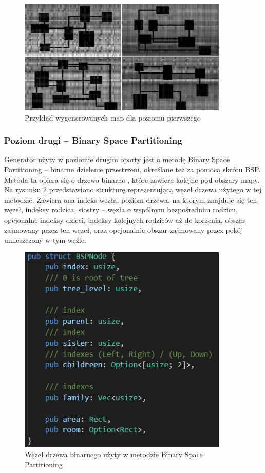 \documentclass[12pt,twoside]{article}
\begin{document}
\FloatBarrier
\begin{figure}[ht]
	\centering
	\includegraphics[width=10cm]{images/generators/level1.png}
	\caption{Przykład wygenerowanych map dla poziomu pierwszego}
	\label{generators:level1}
\end{figure}
\FloatBarrier


\subsubsection{Poziom drugi -- Binary Space Partitioning}
Generator użyty w poziomie drugim oparty jest o metodę Binary Space Partitioning \cite{bsp_source} -- binarne dzielenie przestrzeni, określane też za pomocą skrótu BSP. Metoda ta opiera się o drzewo binarne \cite{book_algo}, które zawiera kolejne pod-obszary mapy. Na rysunku \ref{generators:bsp_node} przedstawiono strukturę reprezentującą węzeł drzewa użytego w tej metodzie. Zawiera ona indeks węzła, poziom drzewa, na którym znajduje się ten węzeł, indeksy rodzica, siostry -- węzła o wspólnym bezpośrednim rodzicu, opcjonalne indeksy dzieci, indeksy kolejnych rodziców aż do korzenia, obszar zajmowany przez ten węzeł, oraz opcjonalnie obszar zajmowany przez pokój umieszczony w tym węźle.

\FloatBarrier
\begin{figure}[ht]
	\centering
	\includegraphics[width=10cm]{images/generators/bsp_node.png}
	\caption{Węzeł drzewa binarnego użyty w metodzie Binary Space Partitioning}
	\label{generators:bsp_node}
\end{figure}
\FloatBarrier
\end{document}
